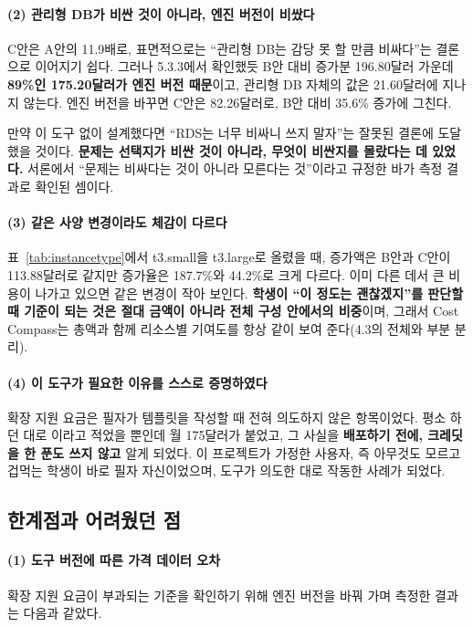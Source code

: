 \documentclass[10pt,a4paper]{article}
\newcommand{\code}[1]{\texttt{\detokenize{#1}}}
\begin{document}
\paragraph{(2) 관리형 DB가 비싼 것이 아니라, 엔진 버전이 비쌌다}
C안은 A안의 11.9배로, 표면적으로는 ``관리형 DB는 감당 못 할 만큼 비싸다''는 결론으로 이어지기 쉽다. 그러나 5.3.3에서 확인했듯 B안 대비 증가분 196.80달러 가운데 \textbf{89\%인 175.20달러가 엔진 버전 때문}이고, 관리형 DB 자체의 값은 21.60달러에 지나지 않는다. 엔진 버전을 바꾸면 C안은 82.26달러로, B안 대비 35.6\% 증가에 그친다.

만약 이 도구 없이 설계했다면 ``RDS는 너무 비싸니 쓰지 말자''는 잘못된 결론에 도달했을 것이다. \textbf{문제는 선택지가 비싼 것이 아니라, 무엇이 비싼지를 몰랐다는 데 있었다.} 서론에서 ``문제는 비싸다는 것이 아니라 모른다는 것''이라고 규정한 바가 측정 결과로 확인된 셈이다.

\paragraph{(3) 같은 사양 변경이라도 체감이 다르다}
표~\ref{tab:instancetype}에서 t3.small을 t3.large로 올렸을 때, 증가액은 B안과 C안이 113.88달러로 같지만 증가율은 187.7\%와 44.2\%로 크게 다르다. 이미 다른 데서 큰 비용이 나가고 있으면 같은 변경이 작아 보인다. \textbf{학생이 ``이 정도는 괜찮겠지''를 판단할 때 기준이 되는 것은 절대 금액이 아니라 전체 구성 안에서의 비중}이며, 그래서 Cost Compass는 총액과 함께 리소스별 기여도를 항상 같이 보여 준다(4.3의 전체와 부분 분리).

\paragraph{(4) 이 도구가 필요한 이유를 스스로 증명하였다}
확장 지원 요금은 필자가 템플릿을 작성할 때 전혀 의도하지 않은 항목이었다. 평소 하던 대로 \code{engine_version = "8.0"}이라고 적었을 뿐인데 월 175달러가 붙었고, 그 사실을 \textbf{배포하기 전에, 크레딧을 한 푼도 쓰지 않고} 알게 되었다. 이 프로젝트가 가정한 사용자, 즉 아무것도 모르고 겁먹는 학생이 바로 필자 자신이었으며, 도구가 의도한 대로 작동한 사례가 되었다.

\subsection{한계점과 어려웠던 점}

\paragraph{(1) 도구 버전에 따른 가격 데이터 오차}
확장 지원 요금이 부과되는 기준을 확인하기 위해 엔진 버전을 바꿔 가며 측정한 결과는 다음과 같았다.
\end{document}
